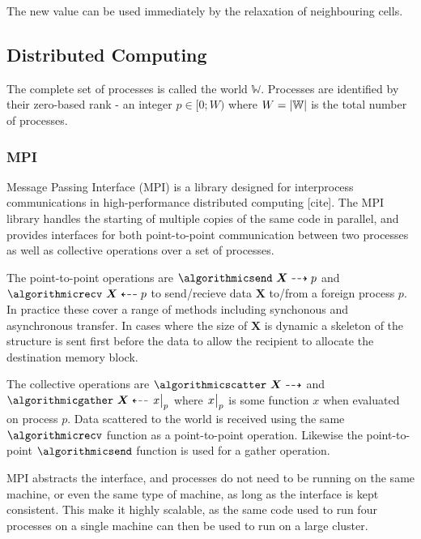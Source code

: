\documentclass[twoside]{IIBproject}
\newcommand{\vect} [1] {\bm{#1}}
\newcommand{\dra}{\dashrightarrow}
\newcommand{\dla}{\dashleftarrow}
\numberwithin{figure}{section}
\begin{document}
        The new value can be used immediately by the relaxation of neighbouring cells.



    \subsection{Distributed Computing} %
        \label{sec:computing}

        The complete set of processes is called the world $\mathbb{W}$. Processes are identified by their zero-based rank - an integer $p \in [0;W)$ where $W=\abs{\mathbb{W}}$ is the total number of processes. 

        \subsubsection{MPI} %
            \label{sec:mpi}

            Message Passing Interface (MPI) is a library designed for interprocess communications in high-performance distributed computing [cite]. The MPI library handles the starting of multiple copies of the same code in parallel, and provides interfaces for both point-to-point communication between two processes as well as collective operations over a set of processes.

            The point-to-point operations are $\algorithmicsend\ \vect{X} \dra p$ and $\algorithmicrecv\ \vect{X} \dla p$ to send/recieve data $\vect{X}$ to/from a foreign process $p$. In practice these cover a range of methods including synchonous and asynchronous transfer. In cases where the size of $\vect{X}$ is dynamic a skeleton of the structure is sent first before the data to allow the recipient to allocate the destination memory block. 

            The collective operations are $\algorithmicscatter\ \vect{X} \dra$ and $\algorithmicgather\ \vect{X} \dla \eval{x}_{p}$ where $\eval{x}_p$ is some function $x$ when evaluated on process $p$. Data scattered to the world is received using the same $\algorithmicrecv$ function as a point-to-point operation. Likewise the point-to-point $\algorithmicsend$ function is used for a gather operation.

            MPI abstracts the interface, and processes do not need to be running on the same machine, or even the same type of machine, as long as the interface is kept consistent. This make it highly scalable, as the same code used to run four processes on a single machine can then be used to run on a large cluster. 
\end{document}
